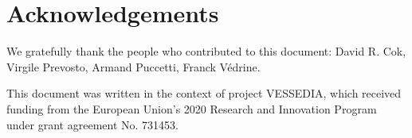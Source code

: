 \documentclass[web]{frama-c-book}
\begin{document}
\section*{Acknowledgements}

We gratefully thank the people who contributed to this document:
David R. Cok, Virgile Prevosto, Armand Puccetti, Franck Védrine.

This document was written in the context of project VESSEDIA,
which received funding from the European Union's 2020
Research and Innovation Program under grant agreement
No. 731453.













\appendix




\end{document}
